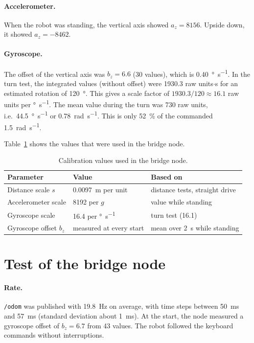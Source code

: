 \paragraph{Accelerometer.} When the robot was standing, the vertical axis showed $a_z = 8156$. Upside down, it showed $a_z = -8462$.

\paragraph{Gyroscope.} The offset of the vertical axis was $b_z = 6.6$ (30 values), which is \SI{0.40}{\degree\per\second}. In the turn test, the integrated values (without offset) were \num{1930.3} raw units$\cdot$\si{\second} for an estimated rotation of \SI{120}{\degree}. This gives a scale factor of $1930.3/120 \approx 16.1$ raw units per \si{\degree\per\second}. The mean value during the turn was 730 raw units, i.e.\ \SI{44.5}{\degree\per\second} or \SI{0.78}{\radian\per\second}. This is only \SI{52}{\percent} of the commanded \SI{1.5}{\radian\per\second}.

Table~\ref{tab:calibration} shows the values that were used in the bridge node.

\begin{table}[H]
  \centering
  \small
  \caption{Calibration values used in the bridge node.}
  \label{tab:calibration}
  \begin{tabular}{@{}l l l@{}}
    \toprule
    \textbf{Parameter} & \textbf{Value} & \textbf{Based on} \\
    \midrule
    Distance scale $s$      & \SI{0.0097}{\metre} per unit     & distance tests, straight drive \\
    Accelerometer scale     & 8192 per $g$                     & value while standing \\
    Gyroscope scale         & 16.4 per \si{\degree\per\second} & turn test (16.1) \\
    Gyroscope offset $b_z$  & measured at every start          & mean over \SI{2}{\second} while standing \\
    \bottomrule
  \end{tabular}
\end{table}

\section{Test of the bridge node}
\label{sec:validation_results}

\paragraph{Rate.} \texttt{/odom} was published with \SI{19.8}{\hertz} on average, with time steps between \SI{50}{\milli\second} and \SI{57}{\milli\second} (standard deviation about \SI{1}{\milli\second}). At the start, the node measured a gyroscope offset of $b_z = 6.7$ from 43 values. The robot followed the keyboard commands without interruptions.

